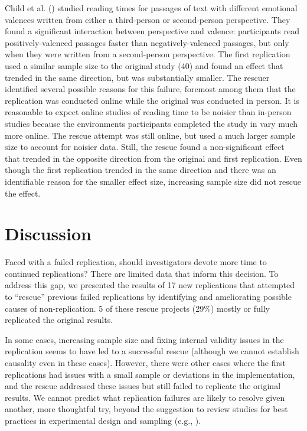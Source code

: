 \documentclass[
  english,
  a4paper,
]{article}
\begin{document}
Child et al. () studied reading times for passages of text with different emotional valences written from either a third-person or second-person perspective.
They found a significant interaction between perspective and valence: participants read positively-valenced passages faster than negatively-valenced passages, but only when they were written from a second-person perspective.
The first replication used a similar sample size to the original study (40) and found an effect that trended in the same direction, but was substantially smaller.
The rescuer identified several possible reasons for this failure, foremost among them that the replication was conducted online while the original was conducted in person.
It is reasonable to expect online studies of reading time to be noisier than in-person studies because the environments participants completed the study in vary much more online.
The rescue attempt was still online, but used a much larger sample size to account for noisier data.
Still, the rescue found a non-significant effect that trended in the opposite direction from the original and first replication.
Even though the first replication trended in the same direction and there was an identifiable reason for the smaller effect size, increasing sample size did not rescue the effect.

\section{Discussion}\label{discussion}

Faced with a failed replication, should investigators devote more time to continued replications?
There are limited data that inform this decision.
To address this gap, we presented the results of 17 new replications that attempted to ``rescue'' previous failed replications by identifying and ameliorating possible causes of non-replication.
5 of these rescue projects (29\%) mostly or fully replicated the original results.

In some cases, increasing sample size and fixing internal validity issues in the replication seems to have led to a successful rescue (although we cannot establish causality even in these cases).
However, there were other cases where the first replications had issues with a small sample or deviations in the implementation, and the rescue addressed these issues but still failed to replicate the original results.
We cannot predict what replication failures are likely to resolve given another, more thoughtful try, beyond the suggestion to review studies for best practices in experimental design and sampling (e.g., ).
\end{document}
